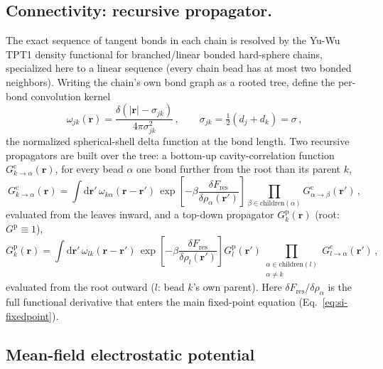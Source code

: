 \documentclass[journal=macl,manuscript=suppinfo,layout=onecolumn]{achemso}
\begin{document}
\subsection{Connectivity: recursive propagator.}
The exact sequence of tangent bonds in each chain is resolved by the Yu-Wu TPT1 density functional\cite{yuDensityFunctionalTheory2002} for branched/linear bonded hard-sphere chains, specialized here to a linear sequence (every chain bead has at most two bonded neighbors). Writing the chain's own bond graph as a rooted tree, define the per-bond convolution kernel
\begin{equation}
    \omega_{jk}(\mathbf{r}) = \frac{\delta(|\mathbf{r}|-\sigma_{jk})}{4\pi\sigma_{jk}^2}\,,\qquad \sigma_{jk}=\tfrac{1}{2}(d_j+d_k)=\sigma\,,
    \label{eq:si-bondkernel}
\end{equation}
the normalized spherical-shell delta function at the bond length. Two recursive propagators are built over the tree: a bottom-up cavity-correlation function $G_{k\to\alpha}^\mathrm{c}(\mathbf{r})$, for every bead $\alpha$ one bond further from the root than its parent $k$,
\begin{equation}
    G_{k\to\alpha}^\mathrm{c}(\mathbf{r}) = \int\!\mathrm{d}\mathbf{r}'\,\omega_{k\alpha}(\mathbf{r}-\mathbf{r}')\,\exp\!\left[-\beta\frac{\delta F_\mathrm{res}}{\delta\rho_\alpha(\mathbf{r}')}\right]\prod_{\beta\in\mathrm{children}(\alpha)} G_{\alpha\to\beta}^\mathrm{c}(\mathbf{r}')\,,
    \label{eq:si-Gc}
\end{equation}
evaluated from the leaves inward, and a top-down propagator $G_k^\mathrm{p}(\mathbf{r})$ (root: $G^\mathrm{p}\equiv1$),
\begin{equation}
    G_k^\mathrm{p}(\mathbf{r}) = \int\!\mathrm{d}\mathbf{r}'\,\omega_{lk}(\mathbf{r}-\mathbf{r}')\,\exp\!\left[-\beta\frac{\delta F_\mathrm{res}}{\delta\rho_l(\mathbf{r}')}\right]G_l^\mathrm{p}(\mathbf{r}')\prod_{\substack{\alpha\in\mathrm{children}(l)\\\alpha\neq k}} G_{l\to\alpha}^\mathrm{c}(\mathbf{r}')\,,
    \label{eq:si-Gp}
\end{equation}
evaluated from the root outward ($l$: bead $k$'s own parent). Here $\delta F_\mathrm{res}/\delta\rho_\alpha$ is the full functional derivative that enters the main fixed-point equation (Eq.~\ref{eq:si-fixedpoint}).

\subsection{Mean-field electrostatic potential}
\label{si:poisson}
\end{document}
